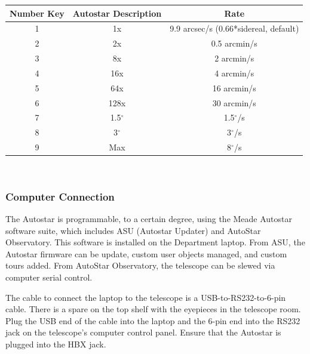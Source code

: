 \documentclass[12pt,titlepage]{article}
\renewcommand\deg{\mbox{$^\circ$}}
\begin{document}
\begin{center}  
\small{
\begin{tabular}{ccc}
Number Key	& Autostar Description	& Rate\\
\hline
1			& 1x				& 9.9 arcsec/s (0.66*sidereal, default)\\[-1ex]
2			& 2x				& 0.5 arcmin/s\\[-1ex]
3			& 8x				& 2 arcmin/s\\[-1ex]
4			& 16x			& 4 arcmin/s\\[-1ex]
5			& 64x			& 16 arcmin/s\\[-1ex]
6			& 128x			& 30 arcmin/s\\[-1ex]
7			& 1.5$\deg$		& 1.5$\deg$/s\\[-1ex]
8			& 3$\deg$		& 3$\deg$/s\\[-1ex]
9 			& Max			& 8$\deg$/s

\end{tabular}}\\
				\label{tab:slew_speeds} 
\vspace{.4 cm}
\end{center}


\subsubsection{Computer Connection}
The Autostar is programmable, to a certain degree, using the Meade Autostar software suite, which includes ASU (Autostar Updater) and AutoStar Observatory. 
This software is installed on the Department laptop.
From ASU, the Autostar firmware can be update, custom user objects managed, and custom tours added.
From AutoStar Observatory, the telescope can be slewed via computer serial control.
\par The cable to connect the laptop to the telescope is a USB-to-RS232-to-6-pin cable.
There is a spare on the top shelf with the eyepieces in the telescope room.
Plug the USB end of the cable into the laptop and the 6-pin end into the RS232 jack on the telescope's computer control panel.
Ensure that the Autostar is plugged into the HBX jack.
\end{document}
